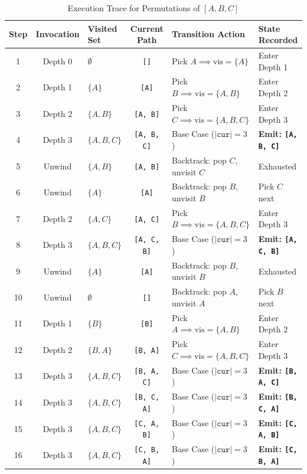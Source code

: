 \documentclass[10pt,journal,compsoc,onecolumn]{IEEEtran}
\begin{document}
\begin{table}[htbp]
\centering
\caption{Execution Trace for Permutations of $[A, B, C]$}
\label{tab:permutations_trace}
\begin{tabular}{cclcll}
\toprule
Step & Invocation & Visited Set & Current Path & Transition Action & State Recorded \\
\midrule
1 & Depth 0 & $\emptyset$ & \texttt{[]} & Pick $A \implies \text{vis}=\{A\}$ & Enter Depth 1 \\
2 & Depth 1 & $\{A\}$ & \texttt{[A]} & Pick $B \implies \text{vis}=\{A, B\}$ & Enter Depth 2 \\
3 & Depth 2 & $\{A, B\}$ & \texttt{[A, B]} & Pick $C \implies \text{vis}=\{A, B, C\}$ & Enter Depth 3 \\
4 & Depth 3 & $\{A, B, C\}$ & \texttt{[A, B, C]} & Base Case ($|\texttt{cur}|=3$) & \textbf{Emit: \texttt{[A, B, C]}} \\
5 & Unwind & $\{A, B\}$ & \texttt{[A, B]} & Backtrack: pop $C$, unvisit $C$ & Exhausted \\
6 & Unwind & $\{A\}$ & \texttt{[A]} & Backtrack: pop $B$, unvisit $B$ & Pick $C$ next \\
7 & Depth 2 & $\{A, C\}$ & \texttt{[A, C]} & Pick $B \implies \text{vis}=\{A, B, C\}$ & Enter Depth 3 \\
8 & Depth 3 & $\{A, B, C\}$ & \texttt{[A, C, B]} & Base Case ($|\texttt{cur}|=3$) & \textbf{Emit: \texttt{[A, C, B]}} \\
9 & Unwind & $\{A\}$ & \texttt{[A]} & Backtrack: pop $B$, unvisit $B$ & Exhausted \\
10 & Unwind & $\emptyset$ & \texttt{[]} & Backtrack: pop $A$, unvisit $A$ & Pick $B$ next \\
11 & Depth 1 & $\{B\}$ & \texttt{[B]} & Pick $A \implies \text{vis}=\{A, B\}$ & Enter Depth 2 \\
12 & Depth 2 & $\{B, A\}$ & \texttt{[B, A]} & Pick $C \implies \text{vis}=\{A, B, C\}$ & Enter Depth 3 \\
13 & Depth 3 & $\{A, B, C\}$ & \texttt{[B, A, C]} & Base Case ($|\texttt{cur}|=3$) & \textbf{Emit: \texttt{[B, A, C]}} \\
14 & Depth 3 & $\{A, B, C\}$ & \texttt{[B, C, A]} & Base Case ($|\texttt{cur}|=3$) & \textbf{Emit: \texttt{[B, C, A]}} \\
15 & Depth 3 & $\{A, B, C\}$ & \texttt{[C, A, B]} & Base Case ($|\texttt{cur}|=3$) & \textbf{Emit: \texttt{[C, A, B]}} \\
16 & Depth 3 & $\{A, B, C\}$ & \texttt{[C, B, A]} & Base Case ($|\texttt{cur}|=3$) & \textbf{Emit: \texttt{[C, B, A]}} \\
\bottomrule
\end{tabular}
\end{table}
\end{document}
